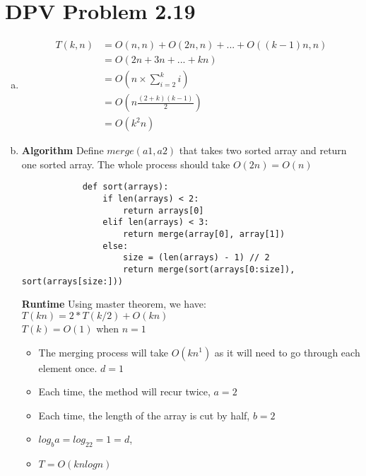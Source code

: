 \documentclass{article}
\def\math#1{$#1$}
\begin{document}
\section{DPV Problem 2.19} 
\begin{enumerate}[a)]
    \item \begin{equation}
        \begin{split}
            T(k, n) &= O(n, n) + O(2n, n) + ... + O((k - 1)n, n) \\
            &= O(2n + 3n + ... + kn) \\
            &= O(n \times \sum_{i = 2}^ki) \\
            &= O(n\frac{(2 + k)(k - 1)}{2}) \\ %
            &= O(k^2n)
        \end{split}
    \end{equation}
    \item \textbf{Algorithm}
        Define \math{merge(a1, a2)} that takes two sorted array and return one sorted array. The whole process should take \math{O(2n) = O(n)}
         \begin{verbatim}
            def sort(arrays):
                if len(arrays) < 2:
                    return arrays[0]
                elif len(arrays) < 3:
                    return merge(array[0], array[1])
                else:
                    size = (len(arrays) - 1) // 2
                    return merge(sort(arrays[0:size]), sort(arrays[size:]))
         \end{verbatim}
    \textbf{Runtime}
    Using master theorem, we have: \\ 
        \math{T(kn) = 2 * T(k/2) + O(kn)} \\
        \math{T(k) = O(1)} when \math{n = 1}
    \begin{itemize}
        \item The merging process will take \math{O(kn^1)} as it will need to go through each element once. \math{d = 1}
        \item Each time, the method will recur twice, \math{a = 2}
        \item Each time, the length of the array is cut by half, \math{b = 2}
        \item \math{log_ba = log_22 = 1 = d}, 
        \item \math{T = O(knlog{n})}
    \end{itemize}
\end{enumerate}
\end{document}
